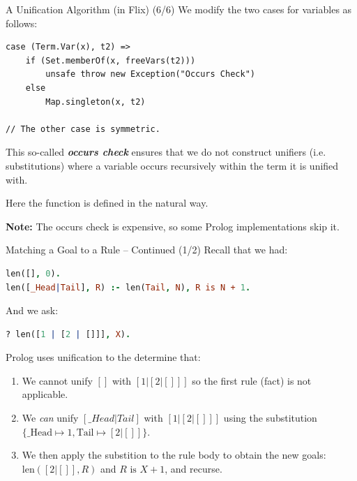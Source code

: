 \begin{frame}[fragile]{A Unification Algorithm (in Flix) (6/6)}
We modify the two cases for variables as follows: 

\begin{lstlisting}[language=flix, xleftmargin=0.5cm]
case (Term.Var(x), t2) => 
    if (Set.memberOf(x, freeVars(t2)))
        unsafe throw new Exception("Occurs Check") 
    else 
        Map.singleton(x, t2)

// The other case is symmetric.
\end{lstlisting}

This so-called \textbf{\emph{occurs check}} ensures that we do not construct
unifiers (i.e. substitutions) where a variable occurs recursively within the term
it is unified with. 

Here the  function is defined in the natural way. 

\pause

\textbf{Note:} The occurs check is expensive, so some Prolog implementations skip it.
\end{frame}  

\begin{frame}[fragile]{Matching a Goal to a Rule -- Continued (1/2)}
Recall that we had: 

\begin{lstlisting}[language=prolog, xleftmargin=0.5cm]
len([], 0).
len([_Head|Tail], R) :- len(Tail, N), R is N + 1.
\end{lstlisting}

And we ask: 

\begin{lstlisting}[language=prolog, xleftmargin=0.5cm]
? len([1 | [2 | []]], X).
\end{lstlisting}

Prolog uses unification to the determine that:

\begin{enumerate}
    \item We cannot unify $[]$ with $[1 | [2 | []]]$ so the first rule (fact) is
    not applicable.
    \item We \emph{can} unify $[\_Head|Tail]$ with $[1 | [2 | []]]$ using the
    substitution $\{ \text{\_Head} \mapsto 1, \text{Tail} \mapsto [2 | []] \}$. 
    \item We then apply the substition to the rule body to obtain the new goals:
    $\text{len}([2 | []], R)$ and $R \text{ is } X + 1$, and recurse.
\end{enumerate}
\end{frame}

